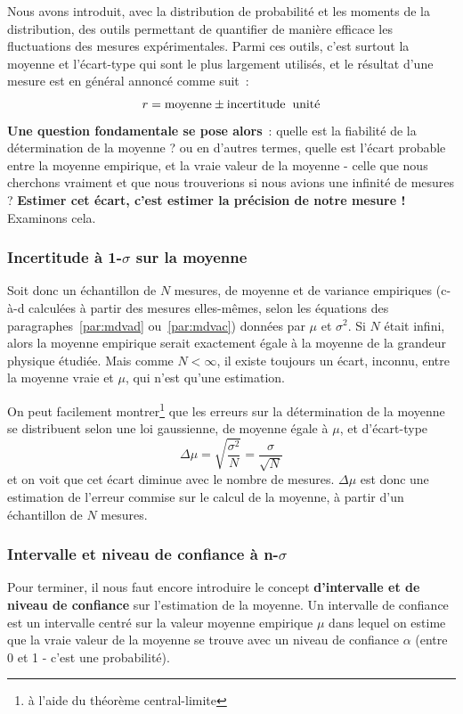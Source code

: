 Nous avons introduit, avec la distribution de probabilité et les moments de la distribution, des outils permettant de quantifier de manière efficace les fluctuations des mesures expérimentales. Parmi ces outils, c'est surtout la moyenne et l'écart-type qui sont le plus largement utilisés, et le résultat d'une mesure est en général annoncé comme suit~:
\[
r=\text{moyenne}\pm\text{incertitude}\hspace{2mm} \text{unité}
\]
\textbf{Une question fondamentale se pose alors}~: quelle est la fiabilité de la détermination de la moyenne ? ou en d'autres termes, quelle est l'écart probable entre la moyenne empirique, et la vraie valeur de la moyenne - celle que nous cherchons vraiment et que nous trouverions si nous avions une infinité de mesures ? \textbf{Estimer cet écart, c'est estimer la précision de notre mesure !} Examinons cela.

\subsubsection{Incertitude à 1-$\sigma$ sur la moyenne}

Soit donc un échantillon de $N$ mesures, de moyenne et de variance empiriques (c-à-d calculées à partir des mesures elles-mêmes, selon les équations des paragraphes~\ref{par:mdvad} ou~\ref{par:mdvac}) données par $\mu$ et $\sigma^2$. Si $N$ était infini, alors la moyenne empirique serait exactement égale à la moyenne de la grandeur physique étudiée. Mais comme $N<\infty$, il existe toujours un écart, inconnu, entre la moyenne vraie et $\mu$, qui n'est qu'une estimation.

On peut facilement montrer\footnote{à l'aide du théorème central-limite} que les erreurs sur la détermination de la moyenne se distribuent selon une loi gaussienne, de moyenne égale à $\mu$, et d'écart-type
\begin{equation}
\Delta\mu=\sqrt{\frac{\sigma^2}{N}}=\frac{\sigma}{\sqrt{N}}
\end{equation}
et on voit que cet écart diminue avec le nombre de mesures. $\Delta\mu$ est donc une estimation de l'erreur commise sur le calcul de la moyenne, à partir d'un échantillon de $N$ mesures.

\subsubsection{Intervalle et niveau de confiance à n-$\sigma$}

Pour terminer, il nous faut encore introduire le concept \textbf{d'intervalle et de niveau de confiance} sur l'estimation de la moyenne. Un intervalle de confiance est un intervalle centré sur la valeur moyenne empirique $\mu$ dans lequel on estime que la vraie valeur de la moyenne se trouve avec un niveau de confiance $\alpha$ (entre 0 et 1 - c'est une probabilité).

